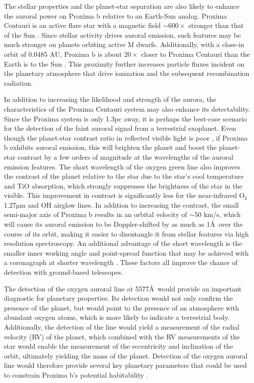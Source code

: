 \documentclass[apjl]{emulateapj}
\begin{document}
The stellar properties and the planet-star separation are also likely to enhance the auroral power on Proxima b relative to an Earth-Sun analog. Proxima Centauri is an active flare star with a magnetic field ${\sim} 600\times$ stronger than that of the Sun \citep{Reiners2008,Davenport2016}. Since stellar activity drives auroral emission, such features may be much stronger on planets orbiting active M dwarfs. Additionally, with a close-in orbit of 0.0485 AU, Proxima b is about $20\times$ closer to Proxima Centauri than the Earth is to the Sun \citep{Anglada-Escude2016}. This proximity further increases particle fluxes incident on the planetary atmosphere that drive ionization and the subsequent recombination radiation.

In addition to increasing the likelihood and strength of the aurora, the characteristics of the Proxima Centauri system may also enhance its detectability. Since the Proxima system is only 1.3pc away, it is perhaps the best-case scenario for the detection of the faint auroral signal from a terrestrial exoplanet. Even though the planet-star contrast ratio in reflected visible light is poor \citep[${\sim} 10^{-7}$; see][]{Turbet2016,Kreidberg2016,Meadows2016}, if Proxima b exhibits auroral emission, this will brighten the planet and boost the planet-star contrast by a few orders of magnitude at the wavelengths of the auroral emission features. The short wavelength of the oxygen green line also improves the contrast of the planet relative to the star due to the star's cool temperature and TiO absorption, which strongly suppresses the brightness of the star in the visible. This improvement in contrast is significantly less for the near-infrared O$_2$ 1.27$\mathrm{\mu}$m and OH airglow lines. In addition to increasing the contrast, the small semi-major axis of Proxima b results in an orbital velocity of ${\sim} 50$ km/s, which will cause its auroral emission to be Doppler-shifted by as much as 1\AA\ over the course of its orbit, making it easier to disentangle it from stellar features via high resolution spectroscopy. An additional advantage of the short wavelength is the smaller inner working angle and point-spread function that may be achieved with a coronagraph at shorter wavelength \citep{Agol2007}. These factors all improve the chance of detection with ground-based telescopes.

The detection of the oxygen auroral line at 5577\AA\ would provide an important diagnostic for planetary properties. Its detection would not only confirm the presence of the planet, but would point to the presence of an atmosphere with abundant oxygen atoms, which is more likely to indicate a terrestrial body. Additionally, the detection of the line would yield a measurement of the radial velocity (RV) of the planet, which combined with the RV measurements of the star \citep{Anglada-Escude2016} would enable the measurement of the eccentricity and inclination of the orbit, ultimately yielding the mass of the planet. Detection of the oxygen auroral line would therefore provide several key planetary parameters that could be used to constrain Proxima b's potential habitability \citep{Barnes2016,Meadows2016}.
\end{document}

